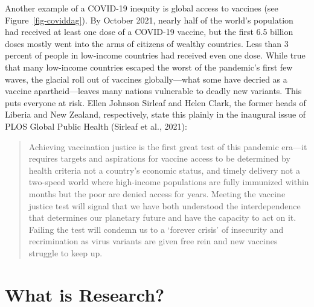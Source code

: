 \documentclass[
  letterpaper,
  DIV=11,
  numbers=noendperiod,
  oneside]{scrreprt}
\begin{document}
Another example of a COVID-19 inequity is global access to vaccines (see
Figure~\ref{fig-coviddag}). By October 2021, nearly half of the world's
population had received at least one dose of a COVID-19 vaccine, but the
first 6.5 billion doses mostly went into the arms of citizens of wealthy
countries. Less than 3 percent of people in low-income countries had
received even one dose. While true that many low-income countries
escaped the worst of the pandemic's first few waves, the glacial roll
out of vaccines globally---what some have decried as a vaccine
apartheid---leaves many nations vulnerable to deadly new variants. This
puts everyone at risk. Ellen Johnson Sirleaf and Helen Clark, the former
heads of Liberia and New Zealand, respectively, state this plainly in
the inaugural issue of PLOS Global Public Health (Sirleaf et al.,
2021):

\begin{quote}
Achieving vaccination justice is the first great test of this pandemic
era---it requires targets and aspirations for vaccine access to be
determined by health criteria not a country's economic status, and
timely delivery not a two-speed world where high-income populations are
fully immunized within months but the poor are denied access for years.
Meeting the vaccine justice test will signal that we have both
understood the interdependence that determines our planetary future and
have the capacity to act on it. Failing the test will condemn us to a
`forever crisis' of insecurity and recrimination as virus variants are
given free rein and new vaccines struggle to keep up.
\end{quote}

\hypertarget{what-is-research}{%
\section{What is Research?}\label{what-is-research}}
\end{document}
